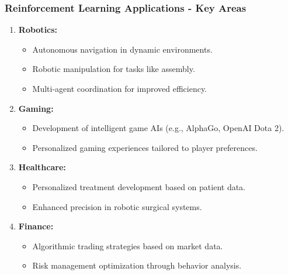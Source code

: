 \documentclass[aspectratio=169]{beamer}
\begin{document}
\begin{frame}[fragile]
    \frametitle{Reinforcement Learning Applications - Key Areas}

    \begin{enumerate}
        \item \textbf{Robotics:}
        \begin{itemize}
            \item Autonomous navigation in dynamic environments.
            \item Robotic manipulation for tasks like assembly.
            \item Multi-agent coordination for improved efficiency.
        \end{itemize}
        
        \item \textbf{Gaming:}
        \begin{itemize}
            \item Development of intelligent game AIs (e.g., AlphaGo, OpenAI Dota 2).
            \item Personalized gaming experiences tailored to player preferences.
        \end{itemize}
        
        \item \textbf{Healthcare:}
        \begin{itemize}
            \item Personalized treatment development based on patient data.
            \item Enhanced precision in robotic surgical systems.
        \end{itemize}
        
        \item \textbf{Finance:}
        \begin{itemize}
            \item Algorithmic trading strategies based on market data.
            \item Risk management optimization through behavior analysis.
        \end{itemize}
    \end{enumerate}
\end{frame}
\end{document}
